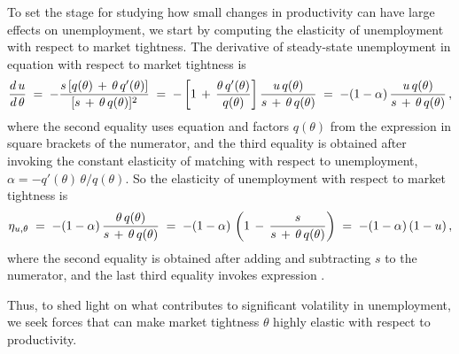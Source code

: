 To set the stage for studying how small changes in productivity
can have large effects on unemployment, we start by computing
the elasticity of unemployment with respect to market tightness.
The derivative of steady-state unemployment in equation
 with respect to market tightness is
$$
{{d}\, u \over {d} \, \theta } \;=\;
- { s \left[q(\theta) \,+\, \theta \,q'(\theta) \right] \over
  [s \,+\, \theta \,q(\theta)]^2 }
\;=\; -
\left[ 1 \,+\, { \theta \,q'(\theta) \over q(\theta)}  \right]
{ u\, q(\theta) \over   s \,+\, \theta \,q(\theta) }
\;=\;  - (1-\alpha)\,
{ u \,q(\theta) \over  s \,+\, \theta \,q(\theta) }
             \,,
$$
where the second equality uses equation  and factors
$q(\theta)$ from the expression in square brackets of the numerator,
and the third equality is obtained after invoking
the constant elasticity of matching with respect to unemployment,
$\alpha=-q'(\theta)\, \theta / q(\theta)$.
So the elasticity of
unemployment with respect to market tightness is
$$
\eta_{u,\theta}
\;=\; -(1-\alpha)\,
{ \theta \,q(\theta) \over  s \,+\, \theta \,q(\theta) }
\;=\; -(1-\alpha)\,
\left(1\,-\, { s \over  s \,+\, \theta \,q(\theta) } \right)
\;=\;  - (1-\alpha)\,(1-u)\,,                  %
$$
where the second equality is obtained after adding and subtracting
$s$ to the numerator, and the last third equality invokes
expression .


Thus, to shed light on what contributes to significant volatility
in unemployment, we seek forces that can make market tightness
$\theta$ highly elastic with respect to productivity.


